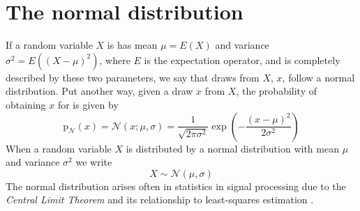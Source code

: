 \chapter{The normal distribution}

If a random variable $X$ is has mean $\mu = E(X)$ and variance $\sigma^{2} =
E((X-\mu)^{2})$, where $E$ is the expectation operator, and is completely
described by these two parameters, we say that draws from $X$, $x$, follow a
normal distribution. Put another way, given a draw $x$ from $X$, the probability of
obtaining $x$ for is given by
\begin{equation}
    \mathrm{p}_{\mathcal{N}}(x)
    =
    \mathcal{N}(x;\mu,\sigma)
    =
    \frac{1}{\sqrt{2\pi\sigma^{2}}}\exp(-\frac{(x-\mu)^{2}}{2\sigma^{2}})
\end{equation}
When a random variable $X$ is distributed by a normal distribution with mean $\mu$
and variance $\sigma^{2}$ we write
\[
    X \sim \mathcal{N}(\mu,\sigma)
\]
The normal distribution arises often in statistics in signal processing due to
the \textit{Central Limit Theorem} \cite{feller2008introduction} and its
relationship to least-squares estimation \cite{kay1993fundamentals}.
